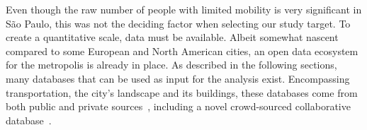 \documentclass[12pt]{article}
\begin{document}

Even though the raw number of people with limited mobility is very significant in São Paulo,
this was not the deciding factor when selecting our study target.
To create a quantitative scale, data must be available.
Albeit somewhat nascent compared to some European and North American cities,
an open data ecosystem for the metropolis is already in place.
As described in the following sections,
many databases that can be used as input for the analysis exist.
Encompassing transportation, the city's landscape and its buildings,
these databases come from both public and private sources~\cite{geosampa:2000, scipopulis, sptrans},
including a novel crowd-sourced collaborative database~\cite{guiaderodas}.




\end{document}
